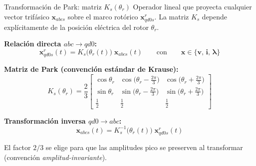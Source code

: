 \documentclass[aspectratio=169,t]{beamer}
\begin{document}
\begin{frame}{Transformación de Park: matriz $K_s(\theta_r)$}
{\small\color{uncGray}Operador lineal que proyecta cualquier vector trifásico $\bm{x}_{abcs}$ sobre el marco rotórico $\bm{x}^{r}_{qd0s}$. La matriz $K_s$ depende explícitamente de la posición eléctrica del rotor $\theta_r$.}\par
\vspace{3mm}

\textbf{Relación directa $abc \rightarrow qd0$:}
\begin{equation*}
\bm{x}^{r}_{qd0s}(t) = K_s\!\big(\theta_r(t)\big)\;\bm{x}_{abcs}(t)
\qquad\text{con}\qquad \bm{x}\in\{\bm{v},\,\bm{i},\,\bm{\lambda}\}
\end{equation*}

\textbf{Matriz de Park (convención estándar de Krause):}
\begin{equation*}
K_s(\theta_r) = \frac{2}{3}
\begin{bmatrix}
\cos\theta_r & \cos\!\big(\theta_r-\tfrac{2\pi}{3}\big) & \cos\!\big(\theta_r+\tfrac{2\pi}{3}\big) \\[4pt]
\sin\theta_r & \sin\!\big(\theta_r-\tfrac{2\pi}{3}\big) & \sin\!\big(\theta_r+\tfrac{2\pi}{3}\big) \\[4pt]
\tfrac{1}{2} & \tfrac{1}{2} & \tfrac{1}{2}
\end{bmatrix}
\end{equation*}

\textbf{Transformación inversa $qd0\rightarrow abc$:}
\begin{equation*}
\bm{x}_{abcs}(t) = K_s^{-1}\!\big(\theta_r(t)\big)\;\bm{x}^{r}_{qd0s}(t)
\end{equation*}

{\small El factor $2/3$ se elige para que las amplitudes pico se preserven al transformar (convención \emph{amplitud-invariante}).}
\end{frame}
\end{document}
